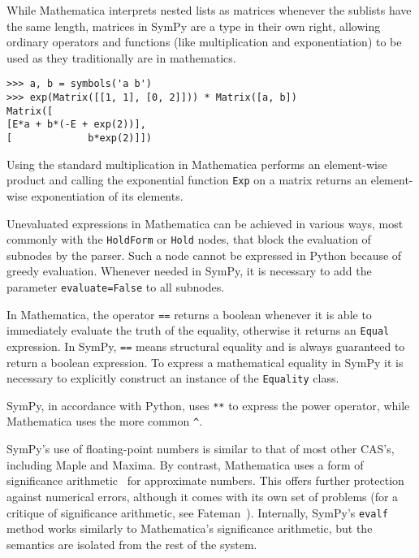 
While Mathematica interprets nested lists as matrices whenever
the sublists have the same length, matrices in SymPy are a type in their own
right, allowing ordinary operators and functions (like multiplication and
exponentiation) to be used as they traditionally are in mathematics.
\begin{verbatim}
>>> a, b = symbols('a b')
>>> exp(Matrix([[1, 1], [0, 2]])) * Matrix([a, b])
Matrix([
[E*a + b*(-E + exp(2))],
[             b*exp(2)]])
\end{verbatim}

Using the standard multiplication in Mathematica performs an element-wise
product and
calling the exponential function \texttt{Exp} on a matrix
returns an element-wise exponentiation of its elements.


Unevaluated expressions in Mathematica can be achieved in various ways,
most commonly with the \texttt{HoldForm} or \texttt{Hold} nodes,
that block the evaluation of subnodes by the parser.
Such a node cannot be expressed in Python because of greedy evaluation.
Whenever needed in SymPy, it is necessary to add the parameter \texttt{evaluate=False}
to all subnodes.


In Mathematica, the operator \texttt{==} returns a boolean whenever it is able
to immediately evaluate the truth of the equality, otherwise it returns an
\texttt{Equal} expression.  In SymPy, \texttt{==} means structural equality and
is always guaranteed to return a boolean expression.  To express a mathematical equality in
SymPy it is necessary to explicitly construct an instance of the \texttt{Equality}
class.


SymPy, in accordance with Python,
uses \texttt{**} to express the power operator, while Mathematica uses the more
common \verb|^|.


SymPy's use of floating-point numbers is similar to that of most
other CAS's, including Maple and Maxima.
By contrast, Mathematica uses a form
of significance arithmetic~\cite{Sofroniou2005precise} for approximate numbers.
This offers further protection against numerical errors,
although it comes with its own set of problems
(for a critique of significance arithmetic, see Fateman~\cite{Fateman1992}).
Internally, SymPy's \texttt{evalf} method works similarly to Mathematica's
significance arithmetic, but the semantics are isolated from the rest of the system.
